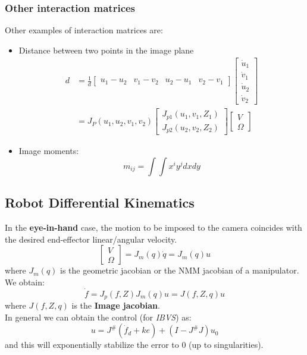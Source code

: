 \documentclass[a4paper,12pt]{article}
\begin{document}
\subsubsection{Other interaction matrices}
Other examples of interaction matrices are:\begin{itemize}
\item Distance between two points in the image plane
\begin{equation}
    \begin{split}
        d & =\frac{1}{d}
        \begin{bmatrix}
            u_1-u_2 & v_1-v_2 & u_2- u_1 & v_2-v_1 
        \end{bmatrix}
        \begin{bmatrix}
            \dot{u}_1 \\
            \dot{v}_1 \\
            \dot{u}_2 \\
            \dot{v}_2
        \end{bmatrix}\\
        & = J_P(u_1,u_2,v_1,v_2) \begin{bmatrix}
        J_{p1}(u_1,v_1,Z_1) \\
        J_{p2}(u_2,v_2,Z_2)
        \end{bmatrix} 
        \begin{bmatrix}
        V\\
        \Omega
        \end{bmatrix}
    \end{split}
\end{equation}
\item Image moments:\begin{equation}
m_{ij}=\int \int x^i y^j dxdy
\end{equation}
\end{itemize}
\subsection{Robot Differential Kinematics}
In the \textbf{eye-in-hand} case, the motion to be imposed to 
the camera coincides with the desired end-effector 
linear/angular velocity.
\begin{equation}
\begin{bmatrix}
    V\\
    \Omega
\end{bmatrix}=J_m(q)\dot{q}=J_m(q)u
\end{equation}
where $J_m(q)$ is the geometric jacobian or the NMM jacobian of 
a manipulator.\\
We obtain: \begin{equation}
\dot{f}=J_p(f,Z)J_m(q)u=J(f,Z,q)u
\end{equation}
where $J(f,Z,q)$ is the \textbf{Image jacobian}.\\
In general we can obtain the control (for \textit{IBVS}) as:
\begin{equation}
    u=J^{\#}(\dot{f}_d+ke) + (I-J^{\#}J) u_0
\end{equation}
and this will exponentially stabilize the error to 0 (up to singularities).
\end{document}
